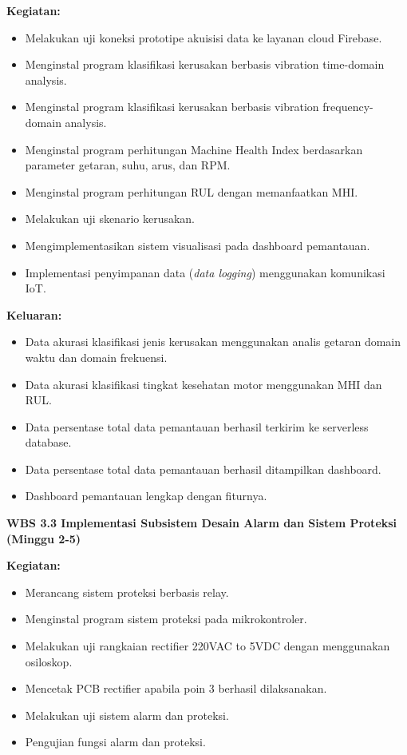 \documentclass{elsinta}
\begin{document}
\textbf{Kegiatan:}
\begin{itemize}
    \item Melakukan uji koneksi prototipe akuisisi data ke layanan cloud Firebase.
    \item Menginstal program klasifikasi kerusakan berbasis vibration time-domain analysis.
    \item Menginstal program klasifikasi kerusakan berbasis vibration frequency-domain analysis.
    \item Menginstal program perhitungan Machine Health Index berdasarkan parameter getaran, suhu, arus, dan RPM.
    \item Menginstal program perhitungan RUL dengan memanfaatkan MHI.
    \item Melakukan uji skenario kerusakan.
    \item Mengimplementasikan sistem visualisasi pada dashboard pemantauan.
    \item Implementasi penyimpanan data (\textit{data logging}) menggunakan komunikasi IoT.
\end{itemize}

\textbf{Keluaran:}
\begin{itemize}
    \item Data akurasi klasifikasi jenis kerusakan menggunakan analis getaran domain waktu dan domain frekuensi.
    \item Data akurasi klasifikasi tingkat kesehatan motor menggunakan MHI dan RUL.
    \item Data persentase total data pemantauan  berhasil terkirim ke serverless database.
    \item Data persentase total data pemantauan berhasil ditampilkan dashboard.
    \item Dashboard pemantauan lengkap dengan fiturnya.
\end{itemize}

\textbf{WBS 3.3 Implementasi Subsistem Desain Alarm dan Sistem Proteksi (Minggu 2-5)}

\textbf{Kegiatan:}
\begin{itemize}
    \item Merancang sistem proteksi berbasis relay.
    \item Menginstal program sistem proteksi pada mikrokontroler.
    \item Melakukan uji rangkaian rectifier 220VAC to 5VDC dengan menggunakan osiloskop.
    \item Mencetak PCB rectifier apabila poin 3 berhasil dilaksanakan.
    \item Melakukan uji sistem alarm dan proteksi.
    \item Pengujian fungsi alarm dan proteksi.
\end{itemize}
\end{document}
